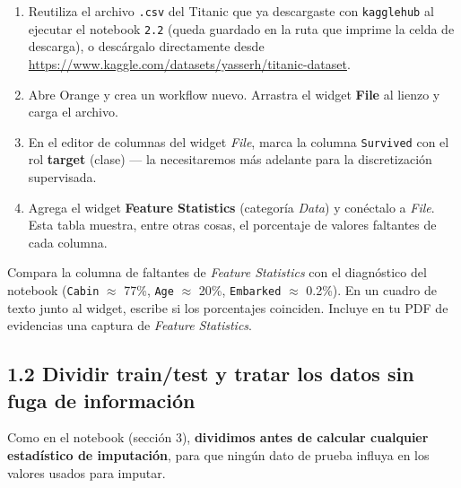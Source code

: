 \documentclass[11pt,letterpaper]{article}
\begin{document}
\begin{enumerate}[leftmargin=1.2cm]
  \item Reutiliza el archivo \texttt{.csv} del Titanic que ya descargaste con \texttt{kagglehub} al ejecutar el notebook \texttt{2.2} (queda guardado en la ruta que imprime la celda de descarga), o descárgalo directamente desde \url{https://www.kaggle.com/datasets/yasserh/titanic-dataset}.
  \item Abre Orange y crea un workflow nuevo. Arrastra el widget \textbf{File} al lienzo y carga el archivo.
  \item En el editor de columnas del widget \textit{File}, marca la columna \texttt{Survived} con el rol \textbf{target} (clase) --- la necesitaremos más adelante para la discretización supervisada.
  \item Agrega el widget \textbf{Feature Statistics} (categoría \textit{Data}) y conéctalo a \textit{File}. Esta tabla muestra, entre otras cosas, el porcentaje de valores faltantes de cada columna.
\end{enumerate}

\begin{actividad}
Compara la columna de faltantes de \textit{Feature Statistics} con el diagnóstico del notebook (\texttt{Cabin} $\approx$ 77\%, \texttt{Age} $\approx$ 20\%, \texttt{Embarked} $\approx$ 0.2\%). En un cuadro de texto junto al widget, escribe si los porcentajes coinciden. Incluye en tu PDF de evidencias una captura de \textit{Feature Statistics}.
\end{actividad}

\subsection{1.2 Dividir train/test y tratar los datos sin fuga de información}

Como en el notebook (sección 3), \textbf{dividimos antes de calcular cualquier estadístico de imputación}, para que ningún dato de prueba influya en los valores usados para imputar.
\end{document}

